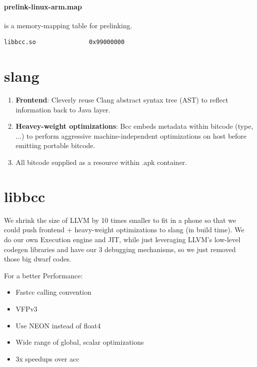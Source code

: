 \paragraph{prelink-linux-arm.map} is a memory-mapping table for prelinking.
\begin{lstlisting}[style=nonumbers]
libbcc.so               0x99000000
\end{lstlisting}
    
\section{slang}

\begin{enumerate}
    \item \textbf{Frontend}: Cleverly reuse Clang abstract syntax tree (AST) to reflect information back to Java layer.
    \item \textbf{Heavey-weight optimizations}: Bcc embeds metadata within bitcode (type, ...) to perform aggressive machine-independent optimizations on host before emitting portable bitcode.
    \item All bitcode supplied as a resource within .apk container.
\end{enumerate}


\section{libbcc}

We shrink the size of LLVM by 10 times smaller to fit in a phone so that we could push frontend + heavy-weight optimizations to slang (in build time).
We do our own Execution engine and JIT, while just leveraging LLVM's low-level codegen libraries and have our 3 debugging mechanisms, so we just removed those big dwarf codes.

For a better Performance:
\begin{itemize}
    \item Fastcc calling convention
    \item VFPv3
    \item Use NEON instead of float4 
    \item Wide range of global, scalar optimizations
    \item 3x speedups over acc 
\end{itemize}
    
